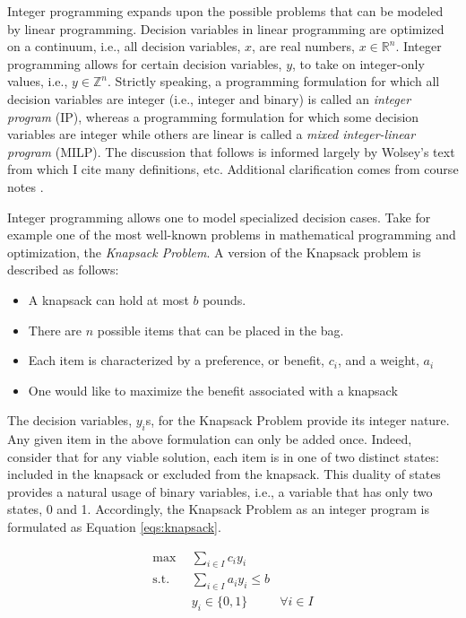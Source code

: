 Integer programming expands upon the possible problems that can be modeled by
linear programming. Decision variables in linear programming are optimized on a
continuum, i.e., all decision variables, $x$, are real numbers,
$x \in \mathbb{R}^n$. Integer programming allows for certain decision variables,
$y$, to take on integer-only values, i.e., $y \in \mathbb{Z}^n$. Strictly
speaking, a programming formulation for which all decision variables are integer
(i.e., integer and binary) is called an \textit{integer program} (IP), whereas a
programming formulation for which some decision variables are integer while
others are linear is called a \textit{mixed integer-linear program} (MILP). The
discussion that follows is informed largely by Wolsey's
text \cite{wolsey_integer_1998} from which I cite many definitions,
etc. Additional clarification comes from course notes \cite{luedtke_class_2010}.

Integer programming allows one to model specialized decision cases. Take for
example one of the most well-known problems in mathematical programming and
optimization, the \textit{Knapsack Problem}. A version of the Knapsack problem
is described as follows:

\begin{itemize}
        \item A knapsack can hold at most $b$ pounds. 
        \item There are $n$ possible items that can be placed in the bag.
        \item Each item is characterized by a preference, or benefit, $c_i$, 
              and a weight, $a_i$
        \item One would like to maximize the benefit associated with a knapsack
\end{itemize}

The decision variables, $y_i$s, for the Knapsack Problem provide its integer
nature. Any given item in the above formulation can only be added once. Indeed,
consider that for any viable solution, each item is in one of two distinct
states: included in the knapsack or excluded from the knapsack. This duality of
states provides a natural usage of binary variables, i.e., a variable that has
only two states, 0 and 1. Accordingly, the Knapsack Problem as an integer
program is formulated as Equation \ref{eqs:knapsack}.

\begin{subequations}\label{eqs:knapsack}
  \begin{align}
    \max \:\: & 
    \sum_{i \in I} c_i y_i
    & \\
    \text{s.t.} \:\: &
    \sum_{i \in I} a_i y_i \leq b 
    & \\
    &
    y_i \in \{ 0, 1 \}
    &
    \forall i \in I
  \end{align}
\end{subequations}

